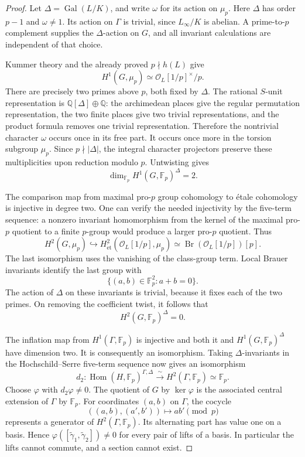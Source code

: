 \begin{proof}
Let \(\Delta=\operatorname{Gal}(L/K)\), and write \(\omega\)
for its action on \(\mu_p\). Here \(\Delta\) has order \(p-1\)
and \(\omega\ne1\). Its action on \(\Gamma\) is trivial, since
\(L_\infty/K\) is abelian. A prime-to-\(p\) complement supplies
the \(\Delta\)-action on \(G\), and all invariant calculations
are independent of that choice.

Kummer theory and the already proved \(p\nmid h(L)\) give
\[
 H^1(G,\mu_p)\simeq\mathcal O_L[1/p]^\times/p .
\]
There are precisely two primes above \(p\), both fixed by
\(\Delta\). The rational \(S\)-unit representation is
\(\mathbb Q[\Delta]\oplus\mathbb Q\): the archimedean places
give the regular permutation representation, the two finite
places give two trivial representations, and the product
formula removes one trivial representation. Therefore the
nontrivial character \(\omega\) occurs once in its free part.
It occurs once more in the torsion subgroup \(\mu_p\).
Since \(p\nmid|\Delta|\), the integral character projectors
preserve these multiplicities upon reduction modulo \(p\).
Untwisting gives
\[
 \dim_{\mathbb F_p}H^1(G,\mathbb F_p)^\Delta=2.
\]

The comparison map from maximal pro-\(p\) group cohomology
to \'{e}tale cohomology is injective in degree two.
One can verify the needed injectivity by the five-term
sequence: a nonzero invariant homomorphism from the kernel
of the maximal pro-\(p\) quotient to a finite \(p\)-group
would produce a larger pro-\(p\) quotient. Thus
\[
 H^2(G,\mu_p)\hookrightarrow
 H^2_{\mathrm{\acute et}}(\mathcal O_L[1/p],\mu_p)
 \simeq\operatorname{Br}(\mathcal O_L[1/p])[p].
\]
The last isomorphism uses the vanishing of the class-group
term. Local Brauer invariants identify the last group with
\[
 \{(a,b)\in\mathbb F_p^2:a+b=0\}.
\]
The action of \(\Delta\) on these invariants is trivial,
because it fixes each of the two primes. On removing the
coefficient twist, it follows that
\[
 H^2(G,\mathbb F_p)^\Delta=0.
\]

The inflation map from \(H^1(\Gamma,\mathbb F_p)\) is
injective and both it and \(H^1(G,\mathbb F_p)^\Delta\)
have dimension two. It is consequently an isomorphism.
Taking \(\Delta\)-invariants in the Hochschild--Serre
five-term sequence now gives an isomorphism
\[
 d_2:\operatorname{Hom}(H,\mathbb F_p)^{\Gamma,\Delta}
       \xrightarrow{\ \sim\ }
       H^2(\Gamma,\mathbb F_p)\simeq\mathbb F_p .
\]
Choose \(\varphi\) with \(d_2\varphi\ne0\). The quotient
of \(G\) by \(\ker\varphi\) is the associated central
extension of \(\Gamma\) by \(\mathbb F_p\).
For coordinates \((a,b)\) on \(\Gamma\), the cocycle
\[
 ((a,b),(a',b'))\longmapsto ab'\pmod p
\]
represents a generator of \(H^2(\Gamma,\mathbb F_p)\).
Its alternating part has value one on a basis. Hence
\(\varphi([\widetilde\gamma_1,\widetilde\gamma_2])\ne0\)
for every pair of lifts of a basis. In particular the
lifts cannot commute, and a section cannot exist.
\end{proof}

